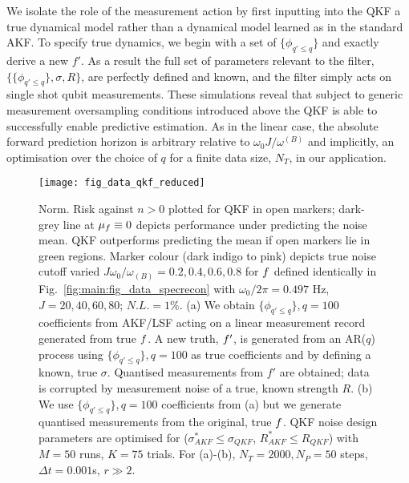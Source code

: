 We isolate the role of the measurement action by first inputting into the QKF a true dynamical model rather than a dynamical model learned as in the standard AKF.  To specify true dynamics, we begin with a set of $\{ \phi_{q'\leq q}\}$ and exactly derive a new $f'$.  As a result the full set of parameters relevant to the filter, $\{\{\phi_{q' \leq q} \}, \sigma, R\}$, are perfectly defined and known, and the filter simply acts on single shot qubit measurements.  These simulations reveal that subject to generic measurement oversampling conditions introduced above the QKF is able to successfully enable predictive estimation.  As in the linear case, the absolute forward prediction horizon is arbitrary relative to $\omega_0 J / \omega^{(B)}$ and implicitly, an optimisation over the choice of $q$ for a finite data size, $N_T$,  in our application. 

\begin{figure}[h!]
	\texttt{[image: fig\_data\_qkf\_reduced]}
	\caption{\label{fig:main:fig_data_qkf2}Norm. Risk against $n>0$ plotted for QKF in open markers; dark-grey line at $\mu_f \equiv 0$ depicts performance under predicting the noise mean. QKF outperforms predicting the mean if open markers lie in green regions. Marker colour (dark indigo to pink) depicts true noise cutoff varied $J \omega_0 / \omega_{(B)} = 0.2, 0.4, 0.6, 0.8$ for $f$ defined identically in  Fig.~\ref{fig:main:fig_data_specrecon} with $\omega_0/ 2\pi = 0.497 $ Hz, $J = 20, 40, 60, 80$;  $N.L. = 1 \%$. (a) We obtain $\{\phi_{q' \leq q}\}, q=100$ coefficients from AKF/LSF acting on a linear measurement record generated from true $f$. A new truth, $f'$, is generated from an AR($q$) process using $\{\phi_{q'\leq q}\}, q=100$ as true coefficients and by defining a known, true $\sigma$. Quantised measurements from $f'$ are obtained; data is corrupted by measurement noise of a true, known strength $R$. (b) We use $\{\phi_{q' \leq q} \}, q=100$ coefficients from (a) but we generate quantised measurements from the original, true $f$. QKF noise design parameters are optimised for ($\sigma_{AKF}^* \leq \sigma_{QKF}$, $R_{AKF}^* \leq R_{QKF}$) with $M=50$ runs, $K=75$ trials. For (a)-(b), $N_T = 2000, N_P = 50$ steps, $\Delta t = 0.001$s, $r\gg 2$.}
\end{figure}


